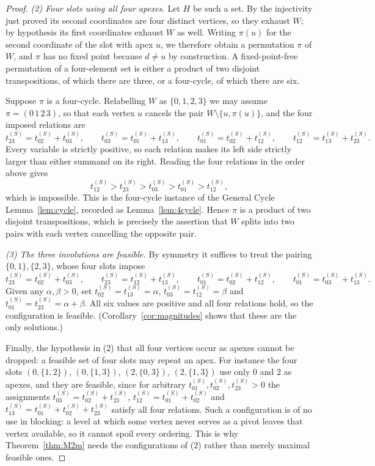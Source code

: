\documentclass[11pt]{article}
\theoremstyle{plain}
\theoremstyle{definition}
\begin{document}
\begin{aiblock}
\begin{proof}
\emph{(2) Four slots using all four apexes.} Let $H$ be such a set. By the injectivity just proved its
second coordinates are four distinct vertices, so they exhaust $W$; by hypothesis its first coordinates
exhaust $W$ as well. Writing $\pi(u)$ for the second coordinate of the slot with apex $u$, we therefore
obtain a permutation $\pi$ of $W$, and $\pi$ has no fixed point because $d\neq u$ by construction. A
fixed-point-free permutation of a four-element set is either a product of two disjoint transpositions,
of which there are three, or a four-cycle, of which there are six.

Suppose $\pi$ is a four-cycle. Relabelling $W$ as $\{0,1,2,3\}$ we may assume
$\pi=(0\,1\,2\,3)$, so that each vertex $u$ cancels the pair $W\setminus\{u,\pi(u)\}$, and the four
imposed relations are
\[
  t^{(S)}_{23}=t^{(S)}_{02}+t^{(S)}_{03},\qquad
  t^{(S)}_{03}=t^{(S)}_{01}+t^{(S)}_{13},\qquad
  t^{(S)}_{01}=t^{(S)}_{02}+t^{(S)}_{12},\qquad
  t^{(S)}_{12}=t^{(S)}_{13}+t^{(S)}_{23}.
\]
Every variable is strictly positive, so each relation makes its left side strictly larger than either
summand on its right. Reading the four relations in the order above gives
\[
  t^{(S)}_{12}>t^{(S)}_{23}>t^{(S)}_{03}>t^{(S)}_{01}>t^{(S)}_{12},
\]
which is impossible. This is the four-cycle instance of the General Cycle
Lemma~\ref{lem:cycle}, recorded as Lemma~\ref{lem:4cycle}. Hence $\pi$ is a product of two disjoint
transpositions, which is precisely the assertion that $W$ splits into two pairs with each vertex
cancelling the opposite pair.

\emph{(3) The three involutions are feasible.} By symmetry it suffices to treat the pairing
$\{0,1\},\{2,3\}$, whose four slots impose
\[
  t^{(S)}_{23}=t^{(S)}_{02}+t^{(S)}_{03},\qquad
  t^{(S)}_{23}=t^{(S)}_{12}+t^{(S)}_{13},\qquad
  t^{(S)}_{01}=t^{(S)}_{02}+t^{(S)}_{12},\qquad
  t^{(S)}_{01}=t^{(S)}_{03}+t^{(S)}_{13}.
\]
Given any $\alpha,\beta>0$, set $t^{(S)}_{02}=t^{(S)}_{13}=\alpha$, $t^{(S)}_{03}=t^{(S)}_{12}=\beta$
and $t^{(S)}_{01}=t^{(S)}_{23}=\alpha+\beta$. All six values are positive and all four relations hold,
so the configuration is feasible. (Corollary~\ref{cor:magnitudes} shows that these are the only
solutions.)

Finally, the hypothesis in (2) that all four vertices occur as apexes cannot be dropped: a feasible
set of four slots may repeat an apex. For instance the four slots $(0,\{1,2\})$, $(0,\{1,3\})$,
$(2,\{0,3\})$, $(2,\{1,3\})$ use only $0$ and $2$ as apexes, and they are feasible, since for
arbitrary $t^{(S)}_{01},t^{(S)}_{02},t^{(S)}_{23}>0$ the assignments
$t^{(S)}_{03}=t^{(S)}_{02}+t^{(S)}_{23}$, $t^{(S)}_{12}=t^{(S)}_{01}+t^{(S)}_{02}$ and
$t^{(S)}_{13}=t^{(S)}_{01}+t^{(S)}_{02}+t^{(S)}_{23}$ satisfy all four relations. Such a configuration
is of no use in blocking: a level at which some vertex never serves as a pivot leaves that vertex
available, so it cannot spoil every ordering. This is why Theorem~\ref{thm:M2m} needs the
configurations of (2) rather than merely maximal feasible ones.
\end{proof}


\end{aiblock}
\end{document}
